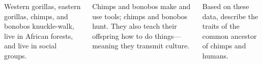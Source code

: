 \begin{frame}[t]
    \begin{adjustwidth}{-2em}{-1.5em}

        \vspace{-6mm}
        \begin{columns}[t]

            
            Western gorillas, eastern gorillas, chimps, and bonobos
            knuckle-walk, live in African forests, and live in social groups.

            \vspace{5mm}
            Chimps and bonobos make and use tools; chimps and bonobos hunt.
            They also teach their offspring how to do things---meaning they
            transmit culture.

            \vspace{5mm}
            Based on these data, describe the traits of the common ancestor of
            chimps and humans.

            


\end{columns}
\end{adjustwidth}
\end{frame}
